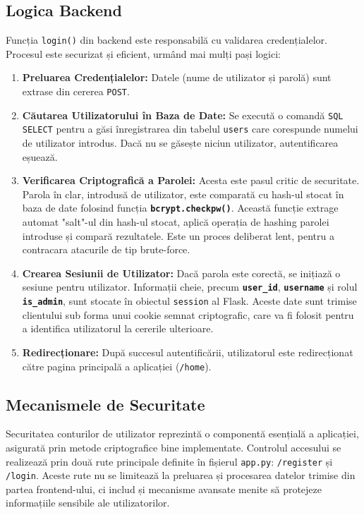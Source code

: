 \documentclass[12pt, a4paper, oneside, romanian]{teza-upb}
\begin{document}
\subsection*{Logica Backend}
Funcția \texttt{login()} din backend este responsabilă cu validarea credențialelor. Procesul este securizat și eficient, urmând mai mulți pași logici:
\begin{enumerate}
	\item \textbf{Preluarea Credențialelor:} Datele (nume de utilizator și parolă) sunt extrase din cererea \texttt{POST}.
	
	\item \textbf{Căutarea Utilizatorului în Baza de Date:} Se execută o comandă \texttt{SQL SELECT} pentru a găsi înregistrarea din tabelul \texttt{users} care corespunde numelui de utilizator introdus. Dacă nu se găsește niciun utilizator, autentificarea eșuează.
	
	\item \textbf{Verificarea Criptografică a Parolei:} Acesta este pasul critic de securitate. Parola în clar, introdusă de utilizator, este comparată cu hash-ul stocat în baza de date folosind funcția \textbf{\texttt{bcrypt.checkpw()}}. Această funcție extrage automat "salt"-ul din hash-ul stocat, aplică operația de hashing parolei introduse și compară rezultatele. Este un proces deliberat lent, pentru a contracara atacurile de tip brute-force.
	
	\item \textbf{Crearea Sesiunii de Utilizator:} Dacă parola este corectă, se inițiază o sesiune pentru utilizator. Informații cheie, precum \textbf{\texttt{user\_id}}, \textbf{\texttt{username}} și rolul \textbf{\texttt{is\_admin}}, sunt stocate în obiectul \texttt{session} al Flask. Aceste date sunt trimise clientului sub forma unui cookie semnat criptografic, care va fi folosit pentru a identifica utilizatorul la cererile ulterioare.
	
	\item \textbf{Redirecționare:} După succesul autentificării, utilizatorul este redirecționat către pagina principală a aplicației (\texttt{/home}).
\end{enumerate}





\subsection{Mecanismele de Securitate}
Securitatea conturilor de utilizator reprezintă o componentă esențială a aplicației, asigurată prin metode criptografice bine implementate. Controlul accesului se realizează prin două rute principale definite în fișierul \texttt{app.py}: \texttt{/register} și \texttt{/login}. Aceste rute nu se limitează la preluarea și procesarea datelor trimise din partea frontend-ului, ci includ și mecanisme avansate menite să protejeze informațiile sensibile ale utilizatorilor.
\end{document}
